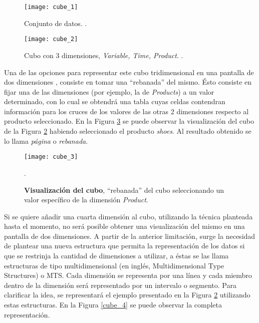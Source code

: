 \documentclass[a4paper,11pt]{article}
\begin{document}
    \begin{figure}
      \begin{center}
        \texttt{[image: cube\_1]}
        \caption{Conjunto de datos. \cite[p.~48]{olap_solutions}.}
        \label{tab_cube}
      \end{center}
    \end{figure}
    
    \begin{figure}
      \begin{center}
        \texttt{[image: cube\_2]}
        \caption{Cubo con 3 dimensiones, \textit{Variable, Time, Product}. \cite[p.~49]{olap_solutions}.}
        \label{cube_2}
      \end{center}
    \end{figure}
    
    
    Una de las opciones para representar este cubo tridimensional en una pantalla de dos dimensiones , consiste en tomar una
    ``rebanada'' del mismo. Ésto consiste en fijar una de las dimensiones (por ejemplo, la de \textit{Products}) a un valor determinado, con lo cual se obtendrá una
    tabla cuyas celdas contendran información para los cruces de los valores de las otras 2 dimensiones respecto al producto seleccionado. En la Figura
    \ref{cube_3} se puede observar la visualización del cubo de la Figura \ref{cube_2} habiendo seleccionado el producto \textit{shoes}. Al resultado obtenido se
    lo llama \textit{página} o \textit{rebanada}.
    
    \begin{figure}
      \begin{center}
        \texttt{[image: cube\_3]}
        \caption{\textbf{Visualización del cubo}, ``rebanada'' del cubo seleccionando un valor específico de la dimensión \textit{Product}.} \cite[p.~51]{olap_solutions}.
        \label{cube_3}
      \end{center}
    \end{figure}
    
    Si se quiere añadir una cuarta dimensión al cubo, utilizando la técnica planteada hasta el momento, no será posible obtener una visualización del mismo en una
    pantalla de dos dimensiones. A partir de la anterior limitación, surge la necesidad de plantear una nueva estructura que permita la representación de los
    datos si que se restrinja la cantidad de dimensiones a utilizar, a éstas se las llama estructuras de tipo multidimensional (en inglés, Multidimensional Type
    Structures) o MTS. Cada dimensión se representa por una línea y cada miembro dentro de la dimensión será representado por un intervalo o segmento. Para
    clarificar la idea, se representará el ejemplo presentado en la Figura \ref{cube_2} utilizando estas estructuras. En la Figura \ref{cube_4} se puede observar
    la completa representación.
    
\end{document}
